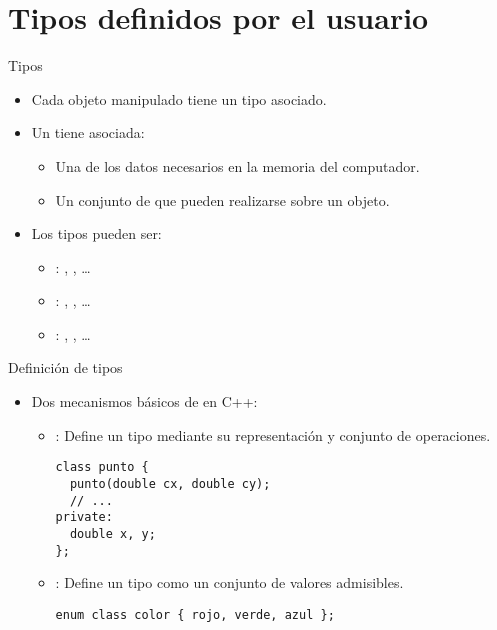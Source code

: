 \section{Tipos definidos por el usuario}

\begin{frame}[t]{Tipos}
\begin{itemize}
  \item Cada objeto manipulado tiene un tipo asociado.

  \item Un  tiene asociada:
    \begin{itemize}
      \item Una  de los datos necesarios 
            en la memoria del computador.
      \item Un conjunto de  
            que pueden realizarse sobre un objeto.
    \end{itemize}

  \item Los tipos pueden ser:
    \begin{itemize}
      \item {}: , , \ldots
      \item {}: , , \ldots
      \item {}: , , \ldots
    \end{itemize}
\end{itemize}
\end{frame}

\begin{frame}[t,fragile]{Definición de tipos}
\begin{itemize}
  \item Dos mecanismos básicos de  en C++:
    \begin{itemize}

      \item {}: 
            Define un tipo mediante su representación y conjunto de operaciones.
\begin{lstlisting}
class punto {
  punto(double cx, double cy);
  // ...
private:
  double x, y;
};
\end{lstlisting}

      \item {}: 
            Define un tipo como un conjunto de valores admisibles.
\begin{lstlisting}
enum class color { rojo, verde, azul };
\end{lstlisting}
    \end{itemize}
\end{itemize}
\end{frame}
